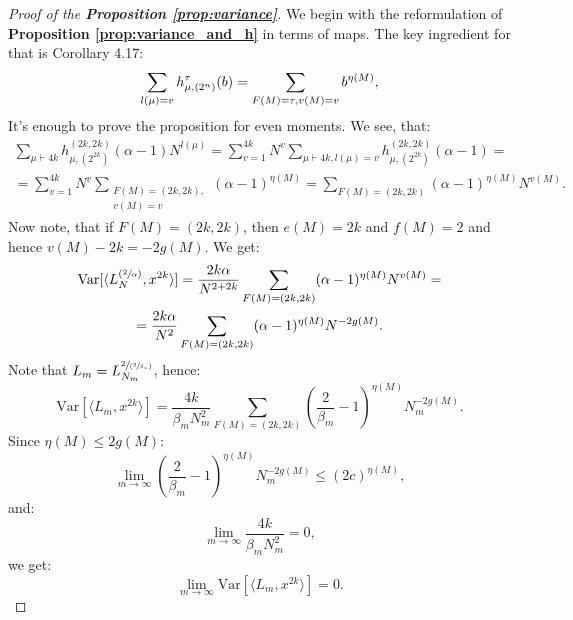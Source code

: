 \documentclass{article}
\newcommand{\Var}{\mathrm{Var}}
\begin{document}
\begin{proof}[Proof of the \textbf{Proposition \ref{prop:variance}}]
    We begin with the reformulation of \textbf{Proposition \ref{prop:variance_and_h}} in terms of maps. The key ingredient for that is 		\cite{lacroix} Corollary 4.17:
	$$
		\sum\limits_{l(\mu) = v}h_{\mu, (2^n)}^{\tau}(b) = \sum\limits_{F(M) = \tau, \\ v(M) = v}b^{\eta(M)},
	$$
    It's enough to prove the proposition for even moments. We see, that:
    \begin{multline}
        \sum\limits_{\mu \vdash 4k}h_{\mu, (2^{2k})}^{(2k, 2k)}(\alpha - 1)N^{l(\mu)} = \sum\limits_{v = 1}^{4k}N^{v}\sum\limits_{\mu \vdash 4k, l(\mu) = v}h_{\mu, (2^{2k})}^{(2k, 2k)}(\alpha - 1) = \\
        = \sum\limits_{v = 1}^{4k}N^v\sum\limits_{\substack{F(M) = (2k, 2k), \\ v(M) = v}}(\alpha - 1)^{\eta(M)} = \sum\limits_{F(M)=(2k,2k)}(\alpha - 1)^{\eta(M)}N^{v(M)}.
    \end{multline}
    Now note, that if $F(M) = (2k, 2k)$, then $e(M) = 2k$ and $f(M) = 2$ and hence $v(M) - 2k = -2g(M)$. We get: 
    \begin{multline}
        \Var[\langle L_{N}^{(\sfrac{2}{\alpha})}, x^{2k} \rangle] = \frac{2k\alpha}{N^{2 + 2k}}\sum\limits_{F(M)=(2k,2k)}(\alpha - 1)^{\eta(M)}N^{v(M)} = \\
        = \frac{2k\alpha}{N^2}\sum\limits_{F(M)=(2k,2k)}(\alpha - 1)^{\eta(M)}N^{-2g(M)}.
    \end{multline}
    Note that $L_m = L_{N_m}^{\sfrac{2}{(\sfrac{2}{\beta_m})}}$, hence:
    $$
        \Var[\langle L_{m}, x^{2k} \rangle] = \frac{4k}{\beta_ mN_m^2}\sum\limits_{F(M)=(2k,2k)}\left(\frac{2}{\beta_m} - 1\right)^{\eta(M)}N_m^{-2g(M)}.
    $$
    Since $\eta(M) \leq 2g(M)$:
    $$
        \lim\limits_{m \to \infty}\left(\frac{2}{\beta_m} - 1\right)^{\eta(M)}N_m^{-2g(M)} \leq (2c)^{\eta(M)},
    $$
    and:
    $$
        \lim\limits_{m \to \infty}\frac{4k}{\beta_ mN_m^2} = 0,
    $$
    we get:
    $$
        \lim\limits_{m \to \infty}\Var[\langle L_{m}, x^{2k} \rangle] = 0.
    $$
    
\end{proof}
\end{document}
